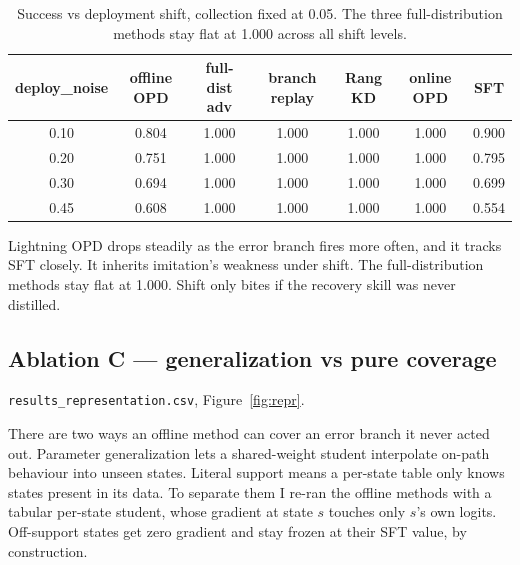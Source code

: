 \documentclass[11pt]{article}
\newcommand{\code}[1]{\texttt{#1}}
\begin{document}
\begin{table}[h]
\centering
\small
\begin{tabular}{c c c c c c c}
\toprule
\textbf{deploy\_noise} & \textbf{offline OPD} & \textbf{full-dist adv} & \textbf{branch replay} & \textbf{Rang KD} & \textbf{online OPD} & \textbf{SFT} \\
\midrule
0.10 & 0.804 & 1.000 & 1.000 & 1.000 & 1.000 & 0.900 \\
0.20 & 0.751 & 1.000 & 1.000 & 1.000 & 1.000 & 0.795 \\
0.30 & 0.694 & 1.000 & 1.000 & 1.000 & 1.000 & 0.699 \\
0.45 & 0.608 & 1.000 & 1.000 & 1.000 & 1.000 & 0.554 \\
\bottomrule
\end{tabular}
\caption{Success vs deployment shift, collection fixed at 0.05. The three
full-distribution methods stay flat at 1.000 across all shift levels.}
\label{tab:deploy}
\end{table}

Lightning OPD drops steadily as the error branch fires more often, and it
tracks SFT closely. It inherits imitation's weakness under shift. The
full-distribution methods stay flat at 1.000. Shift only bites if the recovery
skill was never distilled.

\subsection{Ablation C --- generalization vs pure coverage}
\code{results\_representation.csv}, Figure~\ref{fig:repr}.

There are two ways an offline method can cover an error branch it never acted out.
Parameter generalization lets a shared-weight student interpolate on-path
behaviour into unseen states. Literal support means a per-state table only
knows states present in its data. To separate them I re-ran the offline methods
with a tabular per-state student, whose gradient at state $s$ touches only
$s$'s own logits. Off-support states get zero gradient and stay frozen at their SFT
value, by construction.
\end{document}
